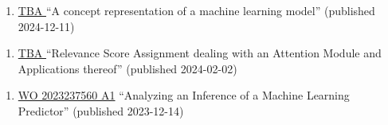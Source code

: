 
\newcommand{\patentref}[5]{\href{#4}{#1 #2} ``#3'' (granted #5)}
\newcommand{\patentpubref}[5]{\href{#4}{#1 #2} ``#3'' (published #5)}




{
    \ifdefined\shortcv
        {}
    \else
        {
            \begin{enumerate}
                \item [] \patentpubref{TBA}
                                        {}
                                        {A concept representation of a machine learning model}
                                        {}
                                        {2024-12-11}
            \end{enumerate}
        }
    \fi
}




{
    \ifdefined\shortcv
        {}
    \else
        {
            \begin{enumerate}
                \item [] \patentpubref{TBA}
                                        {}
                                        {Relevance Score Assignment dealing with an Attention Module and Applications thereof}
                                        {}
                                        {2024-02-02}
            \end{enumerate}
        }
    \fi
}




{
    \ifdefined\shortcv
        {}
    \else
        {
            \begin{enumerate}
                \item [] \patentpubref{WO}
                                        {2023237560 A1}
                                        {Analyzing an Inference of a Machine Learning Predictor}
                                        {https://patentimages.storage.googleapis.com/3d/6c/b6/935e952fe109fa/WO2023237560A1.pdf}
                                        {2023-12-14}
            \end{enumerate}
        }
    \fi
}

